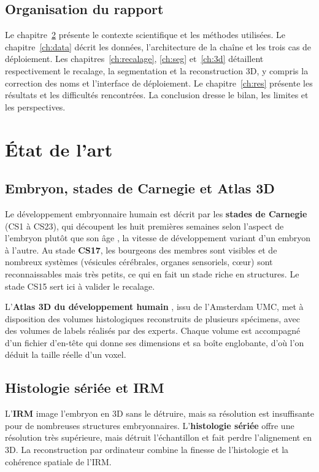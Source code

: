 \documentclass[12pt,a4paper]{report}
\begin{document}
\section{Organisation du rapport}

Le chapitre~\ref{ch:etat} présente le contexte scientifique et les méthodes utilisées. Le chapitre~\ref{ch:data} décrit les données, l'architecture de la chaîne et les trois cas de déploiement. Les chapitres~\ref{ch:recalage}, \ref{ch:seg} et~\ref{ch:3d} détaillent respectivement le recalage, la segmentation et la reconstruction 3D, y compris la correction des noms et l'interface de déploiement. Le chapitre~\ref{ch:res} présente les résultats et les difficultés rencontrées. La conclusion dresse le bilan, les limites et les perspectives.

\chapter{État de l'art}\label{ch:etat}

\section{Embryon, stades de Carnegie et Atlas 3D}

Le développement embryonnaire humain est décrit par les \textbf{stades de Carnegie} (CS1 à CS23), qui découpent les huit premières semaines selon l'aspect de l'embryon plutôt que son âge \cite{orahilly1987}, la vitesse de développement variant d'un embryon à l'autre. Au stade \textbf{CS17}, les bourgeons des membres sont visibles et de nombreux systèmes (vésicules cérébrales, organes sensoriels, c\oe ur) sont reconnaissables mais très petits, ce qui en fait un stade riche en structures. Le stade CS15 sert ici à valider le recalage.

L'\textbf{Atlas 3D du développement humain} \cite{debakker2016}, issu de l'Amsterdam UMC, met à disposition des volumes histologiques reconstruits de plusieurs spécimens, avec des volumes de labels réalisés par des experts. Chaque volume est accompagné d'un fichier d'en-tête qui donne ses dimensions et sa boîte englobante, d'où l'on déduit la taille réelle d'un voxel.

\section{Histologie sériée et IRM}

L'\textbf{IRM} image l'embryon en 3D sans le détruire, mais sa résolution est insuffisante pour de nombreuses structures embryonnaires. L'\textbf{histologie sériée} offre une résolution très supérieure, mais détruit l'échantillon et fait perdre l'alignement en 3D. La reconstruction par ordinateur combine la finesse de l'histologie et la cohérence spatiale de l'IRM.
\end{document}
